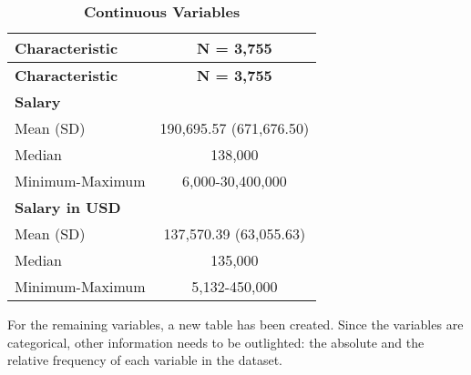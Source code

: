 \documentclass[
]{article}
\begin{document}
\begin{longtable}[]{@{}lc@{}}
\caption{\textbf{Continuous Variables}}\tabularnewline
\toprule\noalign{}
\textbf{Characteristic} & \textbf{N = 3,755} \\
\midrule\noalign{}
\endfirsthead
\toprule\noalign{}
\textbf{Characteristic} & \textbf{N = 3,755} \\
\midrule\noalign{}
\endhead
\bottomrule\noalign{}
\endlastfoot
\textbf{Salary} & \\
Mean (SD) & 190,695.57 (671,676.50) \\
Median & 138,000 \\
Minimum-Maximum & 6,000-30,400,000 \\
\textbf{Salary in USD} & \\
Mean (SD) & 137,570.39 (63,055.63) \\
Median & 135,000 \\
Minimum-Maximum & 5,132-450,000 \\
\end{longtable}

\newline

For the remaining variables, a new table has been created. Since the
variables are categorical, other information needs to be outlighted: the
absolute and the relative frequency of each variable in the dataset.
\newline
\end{document}
